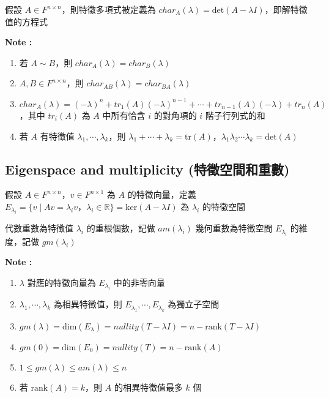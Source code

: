 \documentclass[
]{book}
\providecommand{\tightlist}{%
  \setlength{\itemsep}{0pt}\setlength{\parskip}{0pt}}
\begin{document}
假設 \(A \in F^{n\times n}\)，則特徵多項式被定義為 \(char_A(\lambda) = \mbox{det}(A - \lambda I)\)，即解特徵值的方程式

\textbf{Note :}

\begin{enumerate}
\def\labelenumi{\arabic{enumi}.}
\tightlist
\item
  若 \(A \sim B\)，則 \(char_A(\lambda) = char_B(\lambda)\)
\item
  \(A, B \in F^{n \times n}\)，則 \(char_{AB}(\lambda) = char_{BA}(\lambda)\)
\item
  \(char_A(\lambda) = (-\lambda)^n + tr_1(A)(-\lambda)^{n-1} + \cdots + tr_{n-1}(A)(-\lambda) + tr_n(A)\)，其中 \(tr_i(A)\) 為 \(A\) 中所有恰含 \(i\) 的對角項的 \(i\) 階子行列式的和
\item
  若 \(A\) 有特徵值 \(\lambda_1,\cdots, \lambda_k\)，則 \(\lambda_1 + \cdots + \lambda_k = \mbox{tr}(A)\)，\(\lambda_1\lambda_2\cdots \lambda_k = \mbox{det}(A)\)
\end{enumerate}

\hypertarget{eigenspace-and-multiplicity-ux7279ux5fb5ux7a7aux9593ux548cux91cdux6578}{%
\subsection{Eigenspace and multiplicity (特徵空間和重數)}\label{eigenspace-and-multiplicity-ux7279ux5fb5ux7a7aux9593ux548cux91cdux6578}}

假設 \(A \in F^{n\times n}\)，\(v \in F^{n\times 1}\) 為 \(A\) 的特徵向量，定義 \(E_{\lambda_i} = \{v \mid Av = \lambda_i v，\lambda_i \in \mathbb{R}\} = \mbox{ker}(A - \lambda I)\) 為 \(\lambda_i\) 的特徵空間

代數重數為特徵值 \(\lambda_i\) 的重根個數，記做 \(am(\lambda_i)\)
幾何重數為特徵空間 \(E_{\lambda_i}\) 的維度，記做 \(gm(\lambda_i)\)

\textbf{Note :}

\begin{enumerate}
\def\labelenumi{\arabic{enumi}.}
\tightlist
\item
  \(\lambda\) 對應的特徵向量為 \(E_{\lambda_i}\) 中的非零向量
\item
  \(\lambda_1,\cdots,\lambda_k\) 為相異特徵值，則 \(E_{\lambda_1},\cdots,E_{\lambda_k}\) 為獨立子空間
\item
  \(gm(\lambda) = \mbox{dim}(E_{\lambda}) = nullity(T - \lambda I) = n - \mbox{rank}(T - \lambda I)\)
\item
  \(gm(0) = \mbox{dim}(E_0) = nullity(T) = n - \mbox{rank}(A)\)
\item
  \(1 \leq gm(\lambda) \leq am(\lambda) \leq n\)
\item
  若 \(\mbox{rank}(A) = k\)，則 \(A\) 的相異特徵值最多 \(k\) 個
\end{enumerate}
\end{document}
